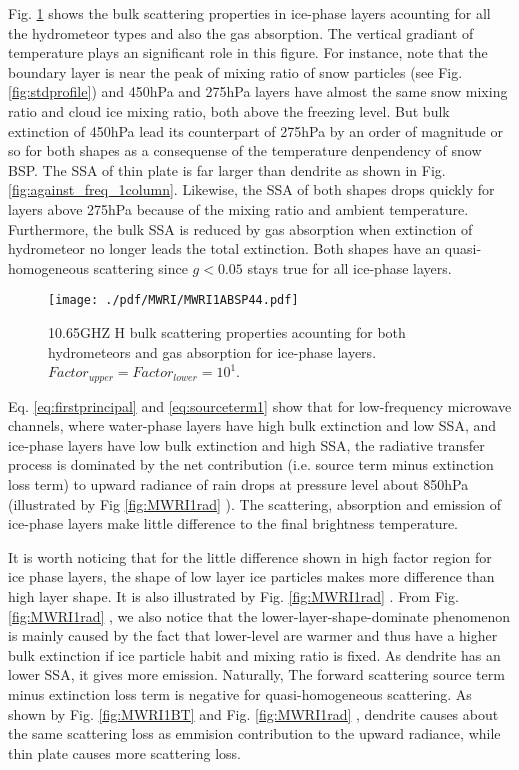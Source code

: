 Fig. \ref{fig:MWRI1ABSP44} shows the bulk scattering properties in ice-phase layers acounting for all the hydrometeor types and also the
gas absorption. The vertical gradiant of temperature plays an significant role in this figure. For instance, note that the boundary layer is near 
the peak of mixing ratio of snow particles (see Fig. \ref{fig:stdprofile}) and 450hPa and 275hPa layers have almost the same snow mixing ratio 
and cloud ice mixing ratio, both above the freezing level. But bulk extinction of 450hPa lead its counterpart of 275hPa by an order of magnitude or so
for both shapes as a consequense of the temperature denpendency of snow BSP.
The SSA of thin plate is far larger than dendrite as shown in Fig. \ref{fig:against_freq_1column}. Likewise, the SSA of both shapes drops quickly
for layers above 275hPa because of the mixing ratio and ambient temperature. 
Furthermore, the bulk SSA is reduced by gas absorption when extinction of hydrometeor no longer leads the total extinction.
Both shapes have an quasi-homogeneous scattering since $g < 0.05$ stays true for all ice-phase layers.

\begin{figure}[hbtp] 
\centering
\texttt{[image: ./pdf/MWRI/MWRI1ABSP44.pdf]}
\caption{10.65GHZ H bulk scattering properties acounting for both hydrometeors and gas absorption for ice-phase layers.
$Factor_{upper} = Factor_{lower} = 10^{1}$.}
\label{fig:MWRI1ABSP44}
\end{figure}

Eq. \ref{eq:firstprincipal} and \ref{eq:sourceterm1} show that for low-frequency microwave channels, where water-phase layers have high bulk extinction and low SSA,
and ice-phase layers have low bulk extinction and high SSA, the radiative transfer process is dominated by the net contribution (i.e. source term minus extinction loss term) to 
upward radiance of rain drops at pressure level about 850hPa (illustrated by Fig \ref{fig:MWRI1rad} ). 
The scattering, absorption and emission of ice-phase layers make little difference to the final brightness temperature.

It is worth noticing that for the little difference shown in high factor region for ice phase layers, the shape of low layer ice particles
makes more difference than high layer shape. It is also illustrated by Fig. \ref{fig:MWRI1rad} .
From Fig. \ref{fig:MWRI1rad} , we also notice that the lower-layer-shape-dominate phenomenon is mainly 
caused by the fact that lower-level are warmer and thus have a higher bulk extinction if ice particle habit and mixing ratio is fixed. 
As dendrite has an lower SSA, it gives more emission.
Naturally, The forward scattering source term minus extinction loss term is negative for quasi-homogeneous scattering.
As shown by Fig. \ref{fig:MWRI1BT} and Fig. \ref{fig:MWRI1rad} , dendrite causes about the same scattering loss as emmision contribution
to the upward radiance, while thin plate causes more scattering loss.

